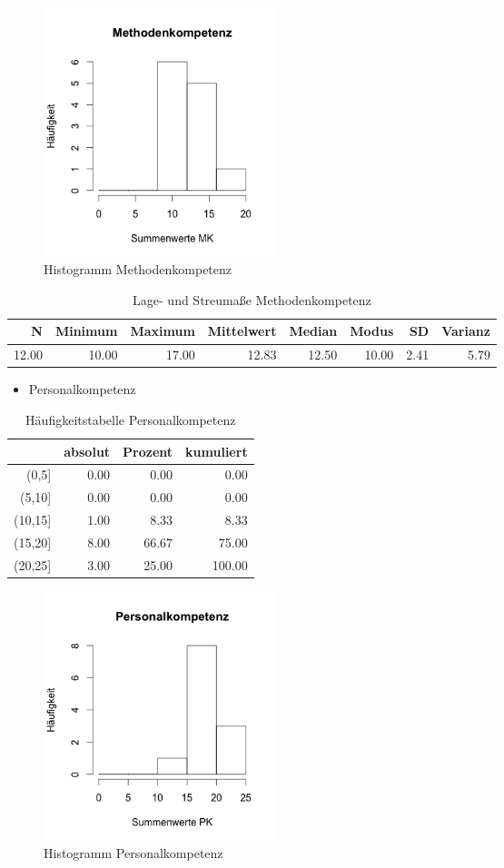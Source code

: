 \documentclass[12pt, bibliography=totoc]{scrartcl}
\begin{document}
\begin{figure}[H]
\centering
\caption{Histogramm Methodenkompetenz}
\includegraphics[width=0.33\textwidth]{Anhang/MKHist.png}
\end{figure}

\begin{table}[H]
\centering
\caption{Lage- und Streumaße Methodenkompetenz}
\begin{tabular}{rrrrrrrr}
  \hline
  N & Minimum & Maximum & Mittelwert & Median & Modus & SD & Varianz \\
  \hline
  12.00 & 10.00 & 17.00 & 12.83 & 12.50 & 10.00 & 2.41 & 5.79 \\
   \hline
\end{tabular}
\end{table}

\begin{itemize}
\tightlist
\item
  Personalkompetenz
\end{itemize}

\begin{table}[H]
\centering
\caption{Häufigkeitstabelle Personalkompetenz}
\begin{tabular}{rrrr}
  \hline
 & absolut & Prozent & kumuliert \\
  \hline
(0,5] & 0.00 & 0.00 & 0.00 \\
  (5,10] & 0.00 & 0.00 & 0.00 \\
  (10,15] & 1.00 & 8.33 & 8.33 \\
  (15,20] & 8.00 & 66.67 & 75.00 \\
  (20,25] & 3.00 & 25.00 & 100.00 \\
   \hline
\end{tabular}
\end{table}

\begin{figure}[H]
\centering
\caption{Histogramm Personalkompetenz}
\includegraphics[width=0.33\textwidth]{Anhang/Persohist.png}
\end{figure}
\end{document}

